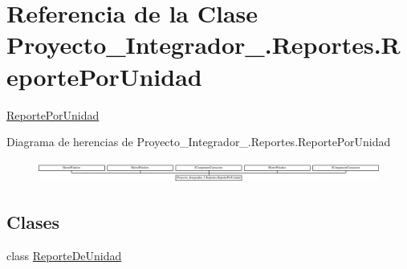 \hypertarget{class_proyecto___integrador__3_1_1_reportes_1_1_reporte_por_unidad}{\section{Referencia de la Clase Proyecto\-\_\-\-Integrador\-\_.\-Reportes.\-Reporte\-Por\-Unidad}
\label{class_proyecto___integrador__3_1_1_reportes_1_1_reporte_por_unidad}
}


\hyperlink{class_proyecto___integrador__3_1_1_reportes_1_1_reporte_por_unidad}{Reporte\-Por\-Unidad}  


Diagrama de herencias de Proyecto\-\_\-\-Integrador\-\_.\-Reportes.\-Reporte\-Por\-Unidad\begin{figure}[H]
\begin{center}
\leavevmode
\includegraphics[height=0.720257cm]{de/dc0/class_proyecto___integrador__3_1_1_reportes_1_1_reporte_por_unidad}
\end{center}
\end{figure}
\subsection*{Clases}
\begin{DoxyCompactItemize}
\item 
class \hyperlink{class_proyecto___integrador__3_1_1_reportes_1_1_reporte_por_unidad_1_1_reporte_de_unidad}{Reporte\-De\-Unidad}
\end{DoxyCompactItemize}

